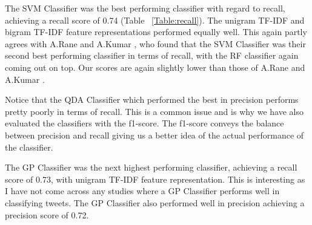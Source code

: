 The SVM Classifier was the best performing classifier with regard to recall, achieving a recall score of 0.74 (Table ~\ref{Table:recall}). The unigram TF-IDF and bigram TF-IDF feature representations performed equally well. This again partly agrees with A.Rane and A.Kumar \cite{Rane2018}, who found that the SVM Classifier was their second best performing classifier in terms of recall, with the RF classifier again coming out on top. Our scores are again slightly lower than those of A.Rane and A.Kumar \cite{Rane2018}.

Notice that the QDA Classifier which performed the best in precision performs pretty poorly in terms of recall. This is a common issue and is why we have also evaluated the classifiers with the f1-score. The f1-score conveys the balance between precision and recall giving us a better idea of the actual performance of the classifier.

The GP Classifier was the next highest performing classifier, achieving a recall score of 0.73, with unigram TF-IDF feature representation. This is interesting as I have not come across any studies where a GP Classifier performs well in classifying tweets. The GP Classifier also performed well in precision achieving a precision score of 0.72. 

